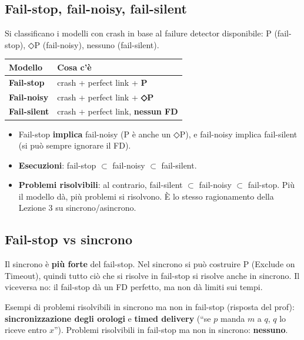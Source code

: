 \subsection{Fail-stop, fail-noisy, fail-silent}

\begin{inbreve}

Si classificano i modelli con crash in base al failure detector disponibile: P (fail-stop), ◇P (fail-noisy), nessuno (fail-silent).

\end{inbreve}

\begin{longtable}[]{@{}ll@{}}
\toprule\noalign{}
Modello & Cosa c'è \\
\midrule\noalign{}
\endhead
\bottomrule\noalign{}
\endlastfoot
\textbf{Fail-stop} & crash + perfect link + \textbf{P} \\
\textbf{Fail-noisy} & crash + perfect link + \textbf{◇P} \\
\textbf{Fail-silent} & crash + perfect link, \textbf{nessun FD} \\
\end{longtable}

\begin{itemize}
\tightlist
\item
  Fail-stop \textbf{implica} fail-noisy (P è anche un ◇P), e fail-noisy implica fail-silent (si può sempre ignorare il FD).
\item
  \textbf{Esecuzioni}: fail-stop \(\subset\) fail-noisy \(\subset\) fail-silent.
\item
  \textbf{Problemi risolvibili}: al contrario, fail-silent \(\subset\) fail-noisy \(\subset\) fail-stop. Più il modello dà, più problemi si risolvono. È lo stesso ragionamento della Lezione 3 su sincrono/asincrono.
\end{itemize}

\subsection{Fail-stop vs sincrono}

Il sincrono è \textbf{più forte} del fail-stop. Nel sincrono si può costruire P (Exclude on Timeout), quindi tutto ciò che si risolve in fail-stop si risolve anche in sincrono. Il viceversa no: il fail-stop dà un FD perfetto, ma non dà limiti sui tempi.

Esempi di problemi risolvibili in sincrono ma non in fail-stop (risposta del prof): \textbf{sincronizzazione degli orologi} e \textbf{timed delivery} (``se \(p\) manda \(m\) a \(q\), \(q\) lo riceve entro \(x\)''). Problemi risolvibili in fail-stop ma non in sincrono: \textbf{nessuno}.

